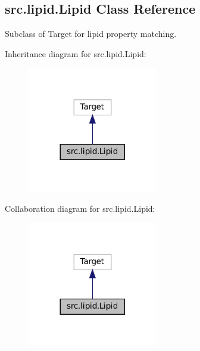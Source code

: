 \hypertarget{classsrc_1_1lipid_1_1Lipid}{}\subsection{src.\+lipid.\+Lipid Class Reference}
\label{classsrc_1_1lipid_1_1Lipid}


Subclass of Target for lipid property matching.  




Inheritance diagram for src.\+lipid.\+Lipid\+:
\nopagebreak
\begin{figure}[H]
\begin{center}
\leavevmode
\includegraphics[width=161pt]{classsrc_1_1lipid_1_1Lipid__inherit__graph}
\end{center}
\end{figure}


Collaboration diagram for src.\+lipid.\+Lipid\+:
\nopagebreak
\begin{figure}[H]
\begin{center}
\leavevmode
\includegraphics[width=161pt]{classsrc_1_1lipid_1_1Lipid__coll__graph}
\end{center}
\end{figure}
